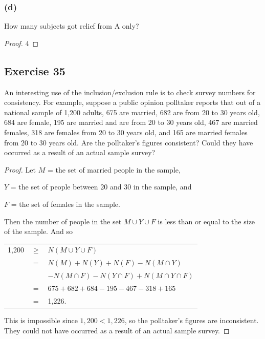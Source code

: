 \documentclass[14pt]{extarticle}
\begin{document}
\subsubsection{(d)}
How many subjects got relief from A only?

\begin{proof}
4
\end{proof}

\subsection{Exercise 35}
An interesting use of the inclusion/exclusion rule is to check survey numbers for consistency. For example, suppose 
a public opinion polltaker reports that out of a national sample of 1,200 adults, 675 are married, 682 are from 20 to 
30 years old, 684 are female, 195 are married and are from 20 to 30 years old, 467 are married females, 318 are 
females from 20 to 30 years old, and 165 are married females from 20 to 30 years old. Are the polltaker’s 
figures consistent? Could they have occurred as a result of an actual sample survey?

\begin{proof}
Let \(M\) = the set of married people in the sample,

\(Y\) = the set of people between 20 and 30 in the sample, and

\(F\) = the set of females in the sample.

Then the number of people in the set \(M \cup Y \cup F\) is less than or equal to the size of the sample. And so 

\begin{tabular}{rcl}
1,200 & \(\geq\) & \(N(M \cup Y \cup F)\) \\
& = & \(N(M) + N(Y) + N(F) - N(M \cap Y)\) \\
&   & \(-N(M \cap F) -N(Y \cap F) + N(M \cap Y \cap F)\) \\ 
& = & \(675 + 682 + 684 - 195 - 467 - 318 + 165\) \\
& = & 1,226.
\end{tabular}

This is impossible since \(1,200 < 1,226\), so the polltaker’s figures are inconsistent. They could not have 
occurred as a result of an actual sample survey.
\end{proof}
\end{document}
